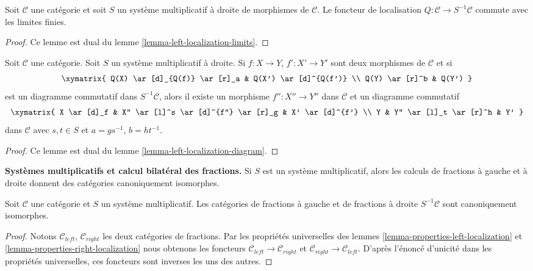 \begin{lemma}
\label{lemma-right-localization-limits}
Soit $\mathcal{C}$ une catégorie et soit $S$ un système multiplicatif à droite
de morphismes de $\mathcal{C}$. Le foncteur de localisation $Q : \mathcal{C} \to S^{-1}\mathcal{C}$ commute avec les limites finies.
\end{lemma}

\begin{proof}
Ce lemme est dual du lemme \ref{lemma-left-localization-limits}.
\end{proof}

\begin{lemma}
\label{lemma-right-localization-diagram}
Soit $\mathcal{C}$ une catégorie. Soit $S$ un système multiplicatif à droite.
Si $f : X \to Y$, $f' : X' \to Y'$ sont deux morphismes de $\mathcal{C}$ et si
$$
\xymatrix{
Q(X) \ar[d]_{Q(f)} \ar[r]_a & Q(X') \ar[d]^{Q(f')} \\
Q(Y) \ar[r]^b & Q(Y')
}
$$
est un diagramme commutatif dans $S^{-1}\mathcal{C}$, alors il existe un
morphisme $f'' : X'' \to Y''$ dans $\mathcal{C}$ et un diagramme commutatif
$$
\xymatrix{
X \ar[d]_f & X'' \ar[l]^s \ar[d]^{f''} \ar[r]_g & X' \ar[d]^{f'} \\
Y & Y'' \ar[l]_t \ar[r]^h & Y'
}
$$
dans $\mathcal{C}$ avec $s, t \in S$ et $a = gs^{-1}$, $b = ht^{-1}$.
\end{lemma}

\begin{proof}
Ce lemme est dual du lemme \ref{lemma-left-localization-diagram}.
\end{proof}

\noindent
{\bf Systèmes multiplicatifs et calcul bilatéral des fractions.} Si $S$ est un
système multiplicatif, alors les calculs de fractions à gauche et à droite donnent des
catégories canoniquement isomorphes.

\begin{lemma}
\label{lemma-multiplicative-system}
Soit $\mathcal{C}$ une catégorie et $S$ un système multiplicatif. Les catégories
de fractions à gauche et de fractions à droite
$S^{-1}\mathcal{C}$ sont canoniquement isomorphes.
\end{lemma}

\begin{proof}
Notons $\mathcal{C}_{left}$, $\mathcal{C}_{right}$ les deux catégories de
fractions. Par les propriétés universelles des lemmes
\ref{lemma-properties-left-localization} et
\ref{lemma-properties-right-localization} nous obtenons les foncteurs
$\mathcal{C}_{left} \to \mathcal{C}_{right}$ et $\mathcal{C}_{right} \to \mathcal{C}_{left}$. D'après l'énoncé d'unicité dans les propriétés
universelles, ces foncteurs sont inverses les uns des autres.
\end{proof}

